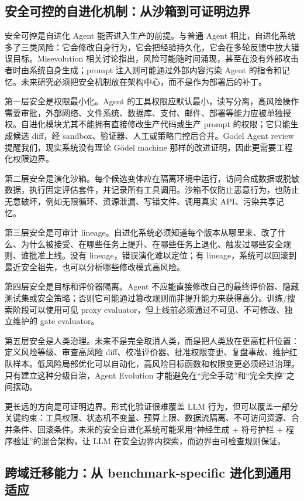 \subsection{安全可控的自进化机制：从沙箱到可证明边界}\label{sec:ch8-safety}

安全可控是自进化 Agent 能否进入生产的前提。与普通 Agent 相比，自进化系统多了三类风险：它会修改自身行为，它会把经验持久化，它会在多轮反馈中放大错误目标。Misevolution 相关讨论指出，风险可能随时间涌现，甚至在没有外部攻击者时由系统自身生成；prompt 注入则可能通过外部内容污染 Agent 的指令和记忆。未来研究必须把安全机制放在架构中心，而不是作为部署后的补丁。

第一层安全是权限最小化。Agent 的工具权限应默认最小，读写分离，高风险操作需要审批，外部网络、文件系统、数据库、支付、邮件、部署等能力应被单独授权。自进化模块尤其不能拥有直接修改生产代码或生产 prompt 的权限；它只能生成候选 diff，经 sandbox、验证器、人工或策略门控后合并。Godel Agent review 提醒我们，现实系统没有理论 G\"{o}del machine 那样的改进证明，因此更需要工程化权限边界。

第二层安全是演化沙箱。每个候选变体应在隔离环境中运行，访问合成数据或脱敏数据，执行固定评估套件，并记录所有工具调用。沙箱不仅防止恶意行为，也防止无意破坏，例如无限循环、资源泄漏、写错文件、调用真实 API、污染共享记忆。

第三层安全是可审计 lineage。自进化系统必须知道每个版本从哪里来、改了什么、为什么被接受、在哪些任务上提升、在哪些任务上退化、触发过哪些安全规则、谁批准上线。没有 lineage，错误演化难以定位；有 lineage，系统可以回滚到最近安全祖先，也可以分析哪些修改模式高风险。

第四层安全是目标和评价器隔离。Agent 不应能直接修改自己的最终评价器、隐藏测试集或安全策略；否则它可能通过篡改规则而非提升能力来获得高分。训练/搜索阶段可以使用可见 proxy evaluator，但上线前必须通过不可见、不可修改、独立维护的 gate evaluator。

第五层安全是人类治理。未来不是完全取消人类，而是把人类放在更高杠杆位置：定义风险等级、审查高风险 diff、校准评价器、批准权限变更、复盘事故、维护红队样本。低风险局部优化可以自动化，高风险目标函数和权限变更必须经过治理。只有建立这种分级自治，Agent Evolution 才能避免在``完全手动''和``完全失控''之间摆动。

更长远的方向是可证明边界。形式化验证很难覆盖 LLM 行为，但可以覆盖一部分关键约束：工具权限、状态机不变量、预算上限、数据流隔离、不可访问资源、合并条件、回滚条件。未来的安全自进化系统可能采用``神经生成 + 符号护栏 + 程序验证''的混合架构，让 LLM 在安全边界内探索，而边界由可检查规则保证。

\subsection{跨域迁移能力：从 benchmark-specific 进化到通用适应}\label{sec:ch8-transfer}

